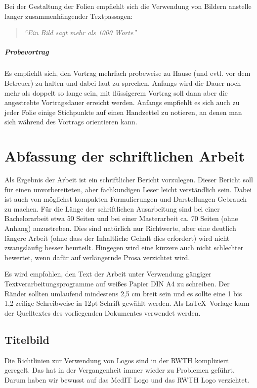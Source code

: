 Bei der Gestaltung der Folien empfiehlt sich die Verwendung von Bildern anstelle langer
zusammenhängender Textpassagen:
\begin{quote}\rmfamily\small\itshape
	"`Ein Bild sagt mehr als 1000 Worte"'
\end{quote}

\paragraph{Probevortrag}
Es empfiehlt sich, den Vortrag mehrfach probeweise zu Hause (und evtl. vor dem Betreuer) zu halten
und dabei laut zu sprechen. Anfangs wird die Dauer noch mehr als doppelt so lange sein, mit
flüssigerem Vortrag soll dann aber die angestrebte Vortragsdauer erreicht werden. Anfangs empfiehlt
es sich auch zu jeder Folie einige Stichpunkte auf einen Handzettel zu notieren, an denen man sich
während des Vortrags orientieren kann.


\chapter{Abfassung der schriftlichen Arbeit}
Als Ergebnis der Arbeit ist ein schriftlicher Bericht
vorzulegen. Dieser Bericht soll für einen unvorbereiteten, aber fachkundigen Leser leicht
verständlich sein. Dabei ist auch von möglichst kompakten Formulierungen und Darstellungen Gebrauch
zu machen. Für die Länge der schriftlichen Ausarbeitung sind bei einer Bachelorarbeit etwa 50 Seiten und bei einer Masterarbeit ca. 70 Seiten (ohne Anhang) anzustreben. Dies sind natürlich nur Richtwerte, aber eine deutlich längere Arbeit (ohne dass der Inhaltliche 
Gehalt dies erfordert) wird nicht zwangsläufig besser beurteilt. Hingegen wird eine kürzere auch nicht schlechter bewertet, wenn dafür auf verlängernde Prosa verzichtet wird.

Es wird empfohlen, den Text der Arbeit unter Verwendung gängiger Textverarbeitungsprogramme auf
weißes Papier DIN A4 zu schreiben. Der Ränder sollten umlaufend mindestens 2,5 cm breit sein und es
sollte eine 1 bis 1,2-zeilige Schreibweise in 12pt Schrift gewählt werden. Als \LaTeX\ Vorlage kann der Quelltextes des vorliegenden Dokumentes verwendet werden.

\section{Titelbild}
Die Richtlinien zur Verwendung von Logos sind in der RWTH kompliziert geregelt. Das hat in der Vergangenheit immer wieder zu Problemen geführt. Darum haben wir bewusst auf das MedIT Logo und das RWTH Logo verzichtet. 

